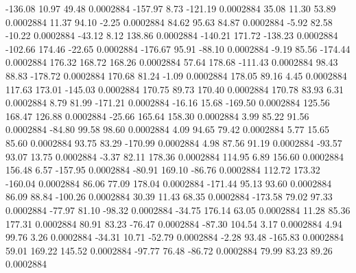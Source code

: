      -136.08       10.97       49.48     0.0002884
     -157.97        8.73     -121.19     0.0002884
       35.08       11.30       53.89     0.0002884
       11.37       94.10       -2.25     0.0002884
       84.62       95.63       84.87     0.0002884
       -5.92       82.58      -10.22     0.0002884
      -43.12        8.12      138.86     0.0002884
     -140.21      171.72     -138.23     0.0002884
     -102.66      174.46      -22.65     0.0002884
     -176.67       95.91      -88.10     0.0002884
       -9.19       85.56     -174.44     0.0002884
      176.32      168.72      168.26     0.0002884
       57.64      178.68     -111.43     0.0002884
       98.43       88.83     -178.72     0.0002884
      170.68       81.24       -1.09     0.0002884
      178.05       89.16        4.45     0.0002884
      117.63      173.01     -145.03     0.0002884
      170.75       89.73      170.40     0.0002884
      170.78       83.93        6.31     0.0002884
        8.79       81.99     -171.21     0.0002884
      -16.16       15.68     -169.50     0.0002884
      125.56      168.47      126.88     0.0002884
      -25.66      165.64      158.30     0.0002884
        3.99       85.22       91.56     0.0002884
      -84.80       99.58       98.60     0.0002884
        4.09       94.65       79.42     0.0002884
        5.77       15.65       85.60     0.0002884
       93.75       83.29     -170.99     0.0002884
        4.98       87.56       91.19     0.0002884
      -93.57       93.07       13.75     0.0002884
       -3.37       82.11      178.36     0.0002884
      114.95        6.89      156.60     0.0002884
      156.48        6.57     -157.95     0.0002884
      -80.91      169.10      -86.76     0.0002884
      112.72      173.32     -160.04     0.0002884
       86.06       77.09      178.04     0.0002884
     -171.44       95.13       93.60     0.0002884
       86.09       88.84     -100.26     0.0002884
       30.39       11.43       68.35     0.0002884
     -173.58       79.02       97.33     0.0002884
      -77.97       81.10      -98.32     0.0002884
      -34.75      176.14       63.05     0.0002884
       11.28       85.36      177.31     0.0002884
       80.91       83.23      -76.47     0.0002884
      -87.30      104.54        3.17     0.0002884
        4.94       99.76        3.26     0.0002884
      -34.31       10.71      -52.79     0.0002884
       -2.28       93.48     -165.83     0.0002884
       59.01      169.22      145.52     0.0002884
      -97.77       76.48      -86.72     0.0002884
       79.99       83.23       89.26     0.0002884
